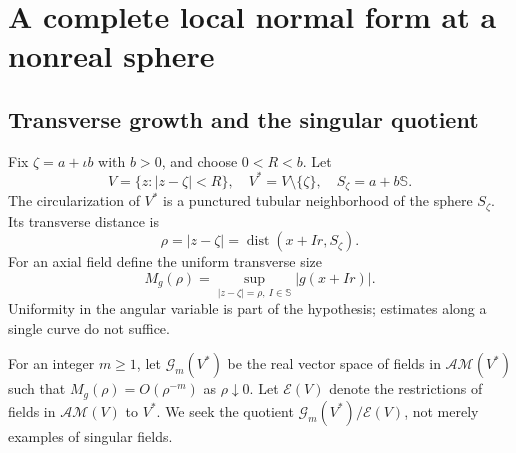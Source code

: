 \documentclass[11pt,a4paper]{article}
\numberwithin{equation}{section}
\theoremstyle{definition}
\theoremstyle{remark}
\newcommand{\Sph}{\mathbb S}
\newcommand{\AM}{\mathcal{AM}}
\DeclareMathOperator{\dist}{dist}
\begin{document}
\section{A complete local normal form at a nonreal sphere}
\label{sec:singularities}

\subsection{Transverse growth and the singular quotient}
Fix $\zeta=a+\iota b$ with $b>0$, and choose $0<R<b$. Let
\[
 V=\{z:|z-\zeta|<R\},\quad V^*=V\setminus\{\zeta\},\quad
 S_\zeta=a+b\Sph.
\]
The circularization of $V^*$ is a punctured tubular neighborhood of the
sphere $S_\zeta$. Its transverse distance is
\[
 \rho=|z-\zeta|=\dist(x+Ir,S_\zeta).
\]
For an axial field define the uniform transverse size
\[
 M_g(\rho)=\sup_{|z-\zeta|=\rho,\ I\in\Sph}|g(x+Ir)|.
\]
Uniformity in the angular variable is part of the hypothesis; estimates
along a single curve do not suffice.

For an integer $m\ge1$, let $\mathcal G_m(V^*)$ be the real vector space
of fields in $\AM(V^*)$ such that $M_g(\rho)=O(\rho^{-m})$ as
$\rho\downarrow0$. Let $\mathcal E(V)$ denote the restrictions of
fields in $\AM(V)$ to $V^*$. We seek the quotient
$\mathcal G_m(V^*)/\mathcal E(V)$, not merely examples of singular fields.
\end{document}
